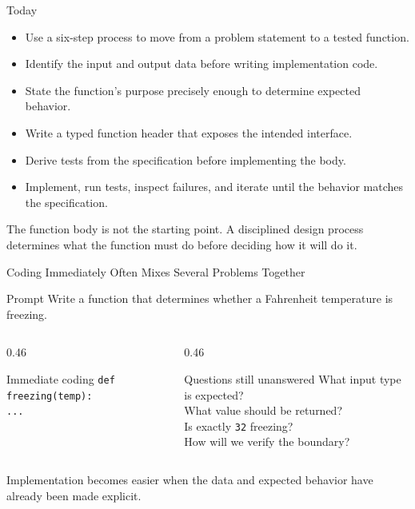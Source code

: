 \documentclass[aspectratio=169,10pt]{beamer}
\begin{document}
\makedecktitle

\begin{frame}{Today}
  \begin{itemize}
    \item Use a six-step process to move from a problem statement to a tested function.
    \item Identify the input and output data before writing implementation code.
    \item State the function's purpose precisely enough to determine expected behavior.
    \item Write a typed function header that exposes the intended interface.
    \item Derive tests from the specification before implementing the body.
    \item Implement, run tests, inspect failures, and iterate until the behavior matches the specification.
  \end{itemize}

  \begin{keyidea}
    The function body is not the starting point. A disciplined design process determines what the function must do before deciding how it will do it.
  \end{keyidea}
\end{frame}


\begin{frame}{Coding Immediately Often Mixes Several Problems Together}
  \begin{block}{Prompt}
    Write a function that determines whether a Fahrenheit temperature is freezing.
  \end{block}

  \begin{columns}[T,onlytextwidth]
    \begin{column}{0.46\textwidth}
      \begin{block}{Immediate coding}
        \texttt{def freezing(temp):}\\
        \hspace*{0.20in}\texttt{...}
      \end{block}
    \end{column}
    \begin{column}{0.46\textwidth}
      \begin{block}{Questions still unanswered}
        What input type is expected?\\
        What value should be returned?\\
        Is exactly \texttt{32} freezing?\\
        How will we verify the boundary?
      \end{block}
    \end{column}
  \end{columns}

  \begin{keyidea}
    Implementation becomes easier when the data and expected behavior have already been made explicit.
  \end{keyidea}
\end{frame}
\end{document}
